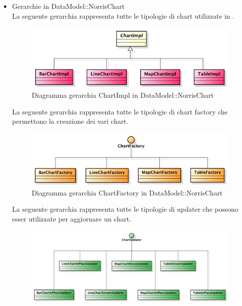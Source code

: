 		\begin{itemize}
			\item Gerarchie in DataModel::NorrisChart \\
				La seguente gerarchia rappresenta tutte le tipologie di chart utilizzate in .
				\begin{figure}[H]
	                \centering
	                \includegraphics[width=1\textwidth]{DefinizioneDiProdotto/Pics/Gerarchie/ModelChartImpl.pdf}
	                \caption{Diagramma gerarchia ChartImpl in DataModel::NorrisChart}
	            \end{figure}
				La seguente gerarchia rappresenta tutte le tipologie di chart factory che permettono la creazione dei vari chart.
				\begin{figure}[H]
	                \centering
	                \includegraphics[width=1\textwidth]{DefinizioneDiProdotto/Pics/Gerarchie/ModelFactory.pdf}
	                \caption{Diagramma gerarchia ChartFactory in DataModel::NorrisChart}
	            \end{figure}
				La seguente gerarchia rappresenta tutte le tipologie di updater che possono esser utilizzate per aggiornare un chart.
				\begin{figure}[H]
	                \centering
	                \includegraphics[width=1\textwidth]{DefinizioneDiProdotto/Pics/Gerarchie/ModelUpdater.pdf}

\end{figure}
\end{itemize}
